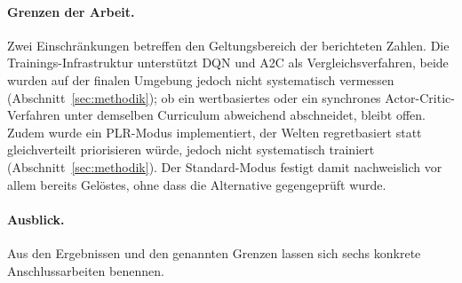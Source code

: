 \documentclass[11pt,a4paper]{article}
\begin{document}
\paragraph{Grenzen der Arbeit.}
Zwei Einschränkungen betreffen den Geltungsbereich der berichteten Zahlen.
Die Trainings-Infrastruktur unterstützt DQN und A2C als Vergleichsverfahren,
beide wurden auf der finalen Umgebung jedoch nicht systematisch vermessen
(Abschnitt~\ref{sec:methodik}); ob ein wertbasiertes oder ein synchrones
Actor-Critic-Verfahren unter demselben Curriculum abweichend abschneidet,
bleibt offen. Zudem wurde ein PLR-Modus implementiert, der Welten
regretbasiert statt gleichverteilt priorisieren würde, jedoch nicht
systematisch trainiert (Abschnitt~\ref{sec:methodik}). Der Standard-Modus
festigt damit nachweislich vor allem bereits Gelöstes, ohne dass die
Alternative gegengeprüft wurde.

\paragraph{Ausblick.}
Aus den Ergebnissen und den genannten Grenzen lassen sich sechs konkrete
Anschlussarbeiten benennen.
\end{document}
